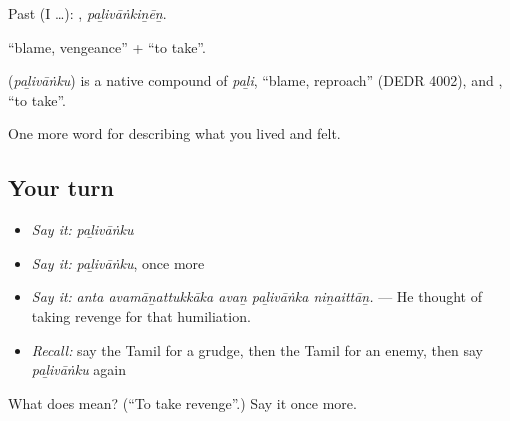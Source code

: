 Past (I …): , \emph{paḻivāṅkiṉēṉ}.

 \textquotedblleft{}blame, vengeance\textquotedblright{} +  \textquotedblleft{}to take\textquotedblright{}.

\begin{cousinweb}
\textbf{} (\emph{paḻivāṅku}) is a native compound of  \emph{paḻi}, \textquotedblleft{}blame, reproach\textquotedblright{} (DEDR 4002), and , \textquotedblleft{}to take\textquotedblright{}.
\end{cousinweb}

\begin{grammarlens}[title={What you've built}]
One more word for describing what you lived and felt.
\end{grammarlens}

\subsection*{Your turn}
\begin{itemize}
\raggedright
  \item \emph{Say it:} \emph{paḻivāṅku}
  \item \emph{Say it:} \emph{paḻivāṅku}, once more
  \item \emph{Say it:} \emph{anta avamāṉattukkāka avaṉ paḻivāṅka niṉaittāṉ.} — He thought of taking revenge for that humiliation.
  \item \emph{Recall:} say the Tamil for a grudge, then the Tamil for an enemy, then say \emph{paḻivāṅku} again
\end{itemize}

\begin{tcolorbox}[breakable,colback=teal!4,colframe=teal!35!black,title={Before you move on}]
What does  mean? (\textquotedblleft{}To take revenge\textquotedblright{}.) Say it once more.
\end{tcolorbox}

